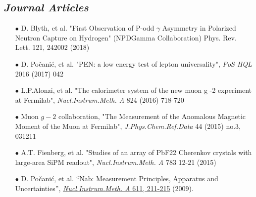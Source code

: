 \documentclass{article}[10pt]
\begin{document}
\subsection*{\emph{Journal Articles}}
\begin{itemize}
\item [$\bullet$] D. Blyth, et al. "First Observation of P-odd $\gamma$ Asymmetry in Polarized Neutron Capture on Hydrogen" (NPDGamma Collaboration) Phys. Rev. Lett. 121, 242002 (2018)
\item [$\bullet$] D. Po\v{c}ani\'c, et al. "PEN: a low energy test of lepton universality", \emph{PoS HQL} 2016 (2017) 042
\item [$\bullet$] L.P.Alonzi, et al. "The calorimeter system of the new muon g -2 experiment at Fermilab", \emph{Nucl.Instrum.Meth. A} 824 (2016) 718-720
\item [$\bullet$] Muon $g-2$ collaboration, "The Measurement of the Anomalous Magnetic Moment of the Muon at Fermilab", \emph{J.Phys.Chem.Ref.Data} 44 (2015) no.3, 031211
\item [$\bullet$] A.T. Fienberg, et al. "Studies of an array of PbF22 Cherenkov crystals with large-area SiPM readout", \emph{Nucl.Instrum.Meth. A} 783 12-21 (2015)
\item [$\bullet$] D. Po\v{c}ani\'c, et al. ``Nab: Measurement Principles, Apparatus and Uncertainties'', \href{http://www.sciencedirect.com/science?_ob=ArticleURL&_udi=B6TJM-4WY6JS6-B&_user=709071&_coverDate=12/11/2009&_rdoc=1&_fmt=high&_orig=search&_origin=search&_sort=d&_docanchor=&view=c&_searchStrId=1563612201&_rerunOrigin=google&_acct=C000039638&_version=1&_urlVersion=0&_userid=709071&md5=602265f8ed1e05dbcd605115545a0871&searchtype=a}{\emph{Nucl.Instrum.Meth. A} 611, 211-215} (2009).
\end{itemize}




\end{document}
